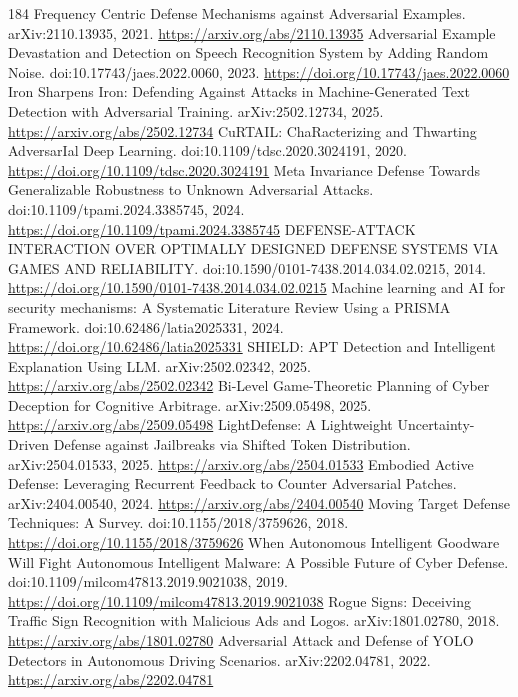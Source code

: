 \documentclass[11pt]{article}
\begin{document}
\begin{thebibliography}{184}
 Frequency Centric Defense Mechanisms against Adversarial Examples. arXiv:2110.13935, 2021. \url{https://arxiv.org/abs/2110.13935}
 Adversarial Example Devastation and Detection on Speech Recognition System by Adding Random Noise. doi:10.17743/jaes.2022.0060, 2023. \url{https://doi.org/10.17743/jaes.2022.0060}
 Iron Sharpens Iron: Defending Against Attacks in Machine-Generated Text Detection with Adversarial Training. arXiv:2502.12734, 2025. \url{https://arxiv.org/abs/2502.12734}
 CuRTAIL: ChaRacterizing and Thwarting AdversarIal Deep Learning. doi:10.1109/tdsc.2020.3024191, 2020. \url{https://doi.org/10.1109/tdsc.2020.3024191}
 Meta Invariance Defense Towards Generalizable Robustness to Unknown Adversarial Attacks. doi:10.1109/tpami.2024.3385745, 2024. \url{https://doi.org/10.1109/tpami.2024.3385745}
 DEFENSE-ATTACK INTERACTION OVER OPTIMALLY DESIGNED DEFENSE SYSTEMS VIA GAMES AND RELIABILITY. doi:10.1590/0101-7438.2014.034.02.0215, 2014. \url{https://doi.org/10.1590/0101-7438.2014.034.02.0215}
 Machine learning and AI for security mechanisms: A Systematic Literature Review Using a PRISMA Framework. doi:10.62486/latia2025331, 2024. \url{https://doi.org/10.62486/latia2025331}
 SHIELD: APT Detection and Intelligent Explanation Using LLM. arXiv:2502.02342, 2025. \url{https://arxiv.org/abs/2502.02342}
 Bi-Level Game-Theoretic Planning of Cyber Deception for Cognitive Arbitrage. arXiv:2509.05498, 2025. \url{https://arxiv.org/abs/2509.05498}
 LightDefense: A Lightweight Uncertainty-Driven Defense against Jailbreaks via Shifted Token Distribution. arXiv:2504.01533, 2025. \url{https://arxiv.org/abs/2504.01533}
 Embodied Active Defense: Leveraging Recurrent Feedback to Counter Adversarial Patches. arXiv:2404.00540, 2024. \url{https://arxiv.org/abs/2404.00540}
 Moving Target Defense Techniques: A Survey. doi:10.1155/2018/3759626, 2018. \url{https://doi.org/10.1155/2018/3759626}
 When Autonomous Intelligent Goodware Will Fight Autonomous Intelligent Malware: A Possible Future of Cyber Defense. doi:10.1109/milcom47813.2019.9021038, 2019. \url{https://doi.org/10.1109/milcom47813.2019.9021038}
 Rogue Signs: Deceiving Traffic Sign Recognition with Malicious Ads and Logos. arXiv:1801.02780, 2018. \url{https://arxiv.org/abs/1801.02780}
 Adversarial Attack and Defense of YOLO Detectors in Autonomous Driving Scenarios. arXiv:2202.04781, 2022. \url{https://arxiv.org/abs/2202.04781}

\end{thebibliography}
\end{document}

